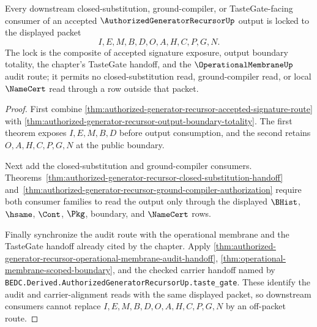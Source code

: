 \begin{theorem}
\label{thm:authorized-generator-recursor-audit-namecert-lock}
Every downstream closed-substitution, ground-compiler, or TasteGate-facing consumer of an accepted $\AuthorizedGeneratorRecursorUp$ output is locked to the displayed packet
$$
I,E,M,B,D,O,A,H,C,P,G,N.
$$
The lock is the composite of accepted signature exposure, output boundary totality, the chapter's TasteGate handoff, and the $\OperationalMembraneUp$ audit route; it permits no closed-substitution read, ground-compiler read, or local $\NameCert$ read through a row outside that packet.
\end{theorem}
\begin{proof}
First combine \autoref{thm:authorized-generator-recursor-accepted-signature-route} with \autoref{thm:authorized-generator-recursor-output-boundary-totality}. The first theorem exposes $I,E,M,B,D$ before output consumption, and the second retains $O,A,H,C,P,G,N$ at the public boundary.

Next add the closed-substitution and ground-compiler consumers. Theorems~\ref{thm:authorized-generator-recursor-closed-substitution-handoff} and~\ref{thm:authorized-generator-recursor-ground-compiler-authorization} require both consumer families to read the output only through the displayed $\BHist$, $\hsame$, $\Cont$, $\Pkg$, boundary, and $\NameCert$ rows.

Finally synchronize the audit route with the operational membrane and the TasteGate handoff already cited by the chapter. Apply \autoref{thm:authorized-generator-recursor-operational-membrane-audit-handoff}, \autoref{thm:operational-membrane-scoped-boundary}, and the checked carrier handoff named by \texttt{BEDC.Derived.AuthorizedGeneratorRecursorUp.taste\_gate}. These identify the audit and carrier-alignment reads with the same displayed packet, so downstream consumers cannot replace $I,E,M,B,D,O,A,H,C,P,G,N$ by an off-packet route.
\end{proof}


